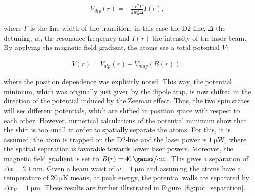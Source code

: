 \begin{align}
	V_{dip}(r) = -\frac{\pi c^2 \Gamma}{2 w_0^3 \Delta} I(r),
\end{align}

where $\Gamma$ is the line width of the transition, in this case the D2 line, $\Delta$ the detuning, $w_0$ the resonance frequency and $I(r)$ the intensity of the laser beam. By applying the magnetic field gradient, the atoms see a total potential $V$:

\begin{align}
	V(r) = V_{dip}(r) + V_{mag}(B(r)),
\end{align}

where the position dependence was explicitly noted. This way, the potential minimum, which was originally just given by the dipole trap, is now shifted in the direction of the potential induced by the Zeeman effect. Thus, the two spin states will see different potentials, which are shifted in position space with respect to each other. However, numerical calculations of the potential minimum show that the shift is too small in order to spatially separate the atoms. For this, it is assumed, the atom is trapped on the D2-line and the laser power is $\SI{1}{\micro\watt}$, where the spatial separation is favorable towards lower laser powers. Moreover, the magnetic field gradient is set to $B(r) = \SI{40}{\gauss\per\centi\meter}$. This gives a separation of $\Delta x = \SI{2.1}{\nano\meter}$. Given a beam waist of $\omega=\SI{1}{\micro\meter}$ and assuming the atoms have a temperature of $\SI{20}{\micro\kelvin}$ means, at peak energy, the potential walls are separated by $\Delta x_V = \SI{1}{\micro\meter}$.
These results are further illustrated in Figure~\ref{fig:pot_separation}.

\begin{figure}[t]%
\label{fig:pot_zeeman}
\end{figure}

